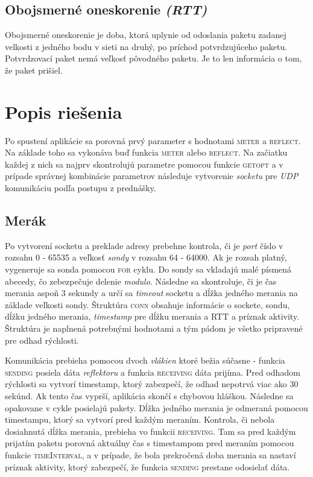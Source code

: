 \documentclass[a4paper, 11pt]{article}
\begin{document}
\subsection{Obojsmerné oneskorenie \emph{(RTT)}}
Obojsmerné oneskorenie je doba, ktorá uplynie od odoslania paketu zadanej velkosti z jedného bodu v sieti na druhý, po príchod potvrdzujúceho paketu. Potvrdzovací paket nemá veľkosť pôvodného paketu. Je to len informácia o tom, že paket prišiel.

\section{Popis riešenia}
Po spustení aplikácie sa porovná prvý parameter s hodnotami \textsc{meter} a \textsc{reflect}. Na základe toho sa vykonáva buď funkcia \textsc{meter} alebo \textsc{reflect}. Na začiatku každej z nich sa najprv skontrolujú parametre pomocou funkcie \textsc{getopt} a v prípade správnej kombinácie parametrov následuje vytvorenie \emph{socketu} pre \emph{UDP} komunikáciu podľa postupu z prednášky.

\subsection{Merák}
Po vytvorení socketu a preklade adresy prebehne kontrola, či je \emph{port} číslo v rozsahu 0 - 65535 a veľkosť \emph{sondy} v rozsahu 64 - 64000. Ak je rozsah platný, vygeneruje sa sonda pomocou \textsc{for} cyklu. Do sondy sa vkladajú malé písmená abecedy, čo zebezpečuje delenie \emph{modulo}. Následne sa skontroluje, či je čas merania aspoň 3 sekundy a určí sa \emph{timeout} socketu a dĺžka jedného merania na základe veľkosti sondy. Štruktúra \textsc{conn} obsahuje informácie o sockete, sondu, dĺžku jedného merania, \emph{timestamp} pre dĺžku merania a RTT a príznak aktivity. Štruktúra je naplnená potrebnými hodnotami a tým pádom je všetko pripravené pre odhad rýchlosti.

Komunikácia prebieha pomocou dvoch \emph{vlákien} ktoré bežia súčasne - funkcia \textsc{sending} posiela dáta \emph{reflektoru} a funkcia \textsc{receiving} dáta prijíma. Pred odhadom rýchlosti sa vytvorí timestamp, ktorý zabezpečí, že odhad nepotrvá viac ako 30 sekúnd. Ak tento čas vyprší, aplikácia skončí s chybovou hláškou. Následne sa opakovane v cykle posielajú pakety. Dĺžka jedného merania je odmeraná pomocou timestampu, ktorý sa vytvorí pred každým meraním. Kontrola, či nebola dosiahnutá dĺžka merania, prebieha vo funkcii \textsc{receiving}. Tam sa pred každým prijatím paketu porovná aktuálny čas s timestampom pred meraním pomocou funkcie \textsc{timeInterval}, a v prípade, že bola prekročená doba merania sa nastaví príznak aktivity, ktorý zabezpečí, že funkcia \textsc{sending} prestane odosielať dáta.
\end{document}
